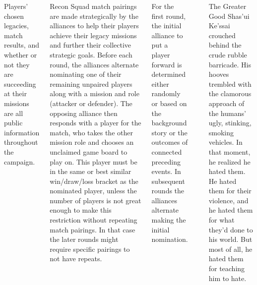 \begin{columns}
Players' chosen legacies, match results, and whether or not they are
succeeding at their missions are all public information throughout the
campaign.


Recon Squad match pairings are made strategically by the alliances to
help their players achieve their legacy missions and further their
collective strategic goals.  Before each round, the alliances
alternate nominating one of their remaining unpaired players along
with a mission and role (attacker or defender).  The opposing alliance
then responds with a player for the match, who takes the other mission
role and chooses an unclaimed game board to play on.  This player must
be in the same or best similar win/draw/loss bracket as the nominated
player, unless the number of players is not great enough to make this
restriction without repeating match pairings.  In that case the later
rounds might require specific pairings to not have repeats.

For the first round, the initial alliance to put a player forward is
determined either randomly or based on the background story or the
outcomes of connected preceding events.  In subsequent rounds the
alliances alternate making the initial nomination.

\columnbreak
\noindent{}\\

\begin{story}{0.75in}{The Greater Good}
  Shas'ui Ke'ssai crouched behind the crude rubble barricade.  His
  hooves trembled with the clamorous approach of the humans' ugly,
  stinking, smoking vehicles.  In that moment, he realized he hated
  them.  He hated them for their violence, and he hated them for what
  they'd done to his world.  But most of all, he hated them for
  teaching him to hate.
\end{story}%
\bigskip


\end{columns}
